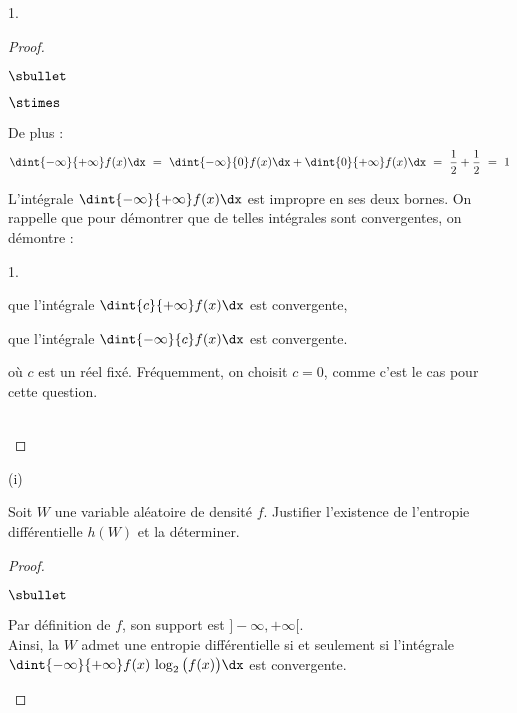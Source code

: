 \documentclass[11pt]{article}%
\begin{document}
\begin{noliste}{1.}
\begin{proof}
\begin{noliste}{$\sbullet$}
\begin{noliste}{$\stimes$}
      \item De plus :
        \[
          \dint{-\infty}{+\infty} f(x) \dx \ = \ \dint{-\infty}{0}
          f(x) \dx + \dint{0}{+\infty} f(x) \dx \ = \ \dfrac{1}{2} +
          \dfrac{1}{2} \ = \ 1
        \]
      \end{noliste}
    \end{noliste}
    \begin{remark}
      L'intégrale $\dint{-\infty}{+\infty} f(x) \dx$ est impropre en
      ses deux bornes. On rappelle que pour démontrer que de telles
      intégrales sont convergentes, on démontre :
      \begin{noliste}{\scriptsize 1.}
      \item que l'intégrale $\dint{c}{+\infty} f(x) \dx$ est convergente,
        
      \item que l'intégrale $\dint{-\infty}{c} f(x) \dx$ est convergente.
      \end{noliste}
      où $c$ est un réel fixé. Fréquemment, on choisit $c=0$, comme
      c'est le cas pour cette question.
    \end{remark}~\\[-1.4cm]
  \end{proof}
  
  \begin{noliste}{(i)}
    \setcounter{enumii}{1}
  \item Soit $W$ une variable aléatoire de densité $f$. Justifier
    l'existence de l'entropie différentielle $h(W)$ et la déterminer.
  \end{noliste}
  
  \begin{proof}~
    \begin{noliste}{$\sbullet$}
    \item Par définition de $f$, son support est $]-\infty,
      +\infty[$.\\
      Ainsi, la \var $W$ admet une entropie différentielle si et
      seulement si l'intégrale $\dint{-\infty}{+\infty} f(x) \, \log_2
      \big( f(x) \big) \dx$ est convergente.
      

\end{noliste}
\end{proof}
\end{noliste}
\end{document}
